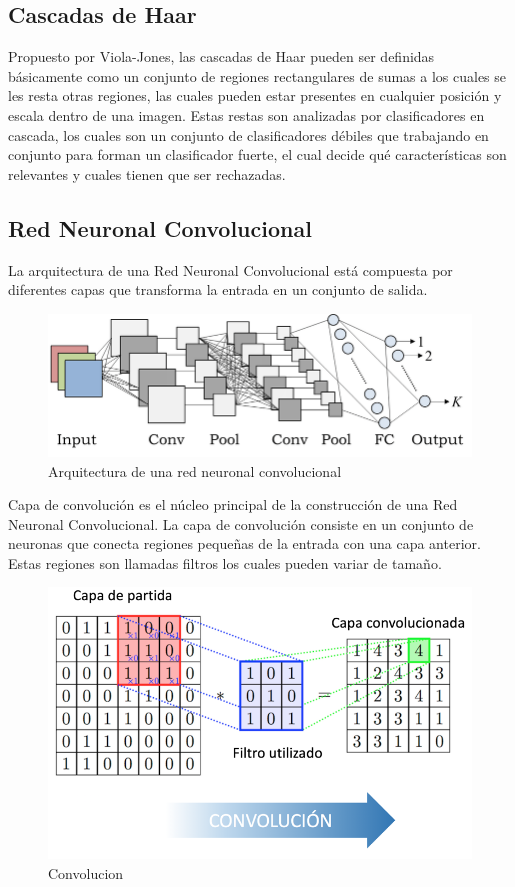 \documentclass[a4paper,11pt]{report}
\begin{document}
\subsection{Cascadas de Haar}
Propuesto por Viola-Jones, las cascadas de Haar pueden ser  definidas básicamente como un conjunto de regiones rectangulares de sumas a los cuales se les resta otras regiones, las cuales pueden estar presentes en cualquier posición y escala dentro de una imagen. Estas restas son analizadas por clasificadores en cascada, los cuales son un conjunto de clasificadores débiles que trabajando en conjunto para forman un clasificador fuerte, el cual decide qué características son relevantes y cuales tienen que ser rechazadas.

\subsection{Red Neuronal Convolucional}
La arquitectura de una Red Neuronal Convolucional está compuesta por diferentes capas que transforma la entrada en un conjunto de salida.
\begin{figure}[h]
 \centering
  \includegraphics[scale=0.2]{cnn}
  \caption{Arquitectura de una red neuronal convolucional}
  \label{fig:Arquitectura Cnn}
\end{figure}

Capa de convolución es el núcleo principal de la construcción de una Red Neuronal Convolucional. La capa de convolución consiste en un conjunto de neuronas que conecta regiones pequeñas de la entrada con una capa anterior. Estas regiones son llamadas filtros los cuales pueden variar de tamaño.

\begin{figure}[h]
 \centering
  \includegraphics[scale=0.4]{convolucion}
  \caption{Convolucion}
  \label{fig:Convolucion}
\end{figure}
\end{document}
